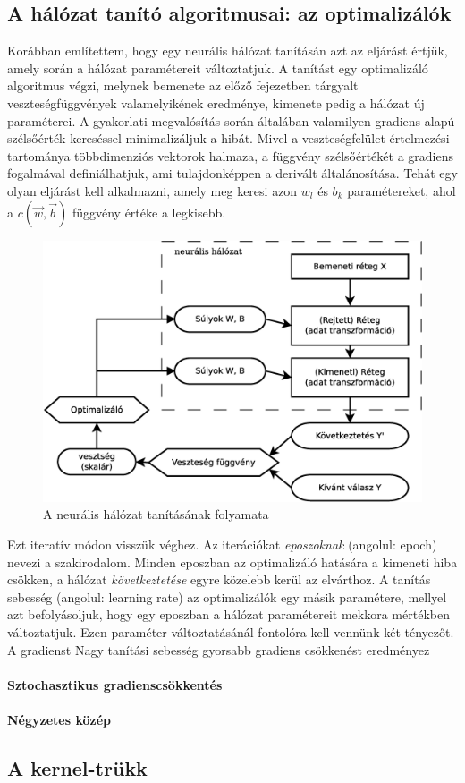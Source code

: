 \subsection{A hálózat tanító algoritmusai: az optimalizálók}
Korábban említettem, hogy egy neurális hálózat tanításán azt az eljárást értjük, amely során a hálózat paramétereit változtatjuk. A tanítást egy optimalizáló algoritmus végzi, melynek bemenete az előző fejezetben tárgyalt veszteségfüggvények valamelyikének eredménye, kimenete pedig a hálózat új paraméterei. A gyakorlati megvalósítás során általában valamilyen gradiens alapú szélsőérték kereséssel minimalizáljuk a hibát. Mivel a veszteségfelület értelmezési tartománya többdimenziós vektorok halmaza, a függvény szélsőértékét a gradiens fogalmával definiálhatjuk, ami tulajdonképpen a derivált általánosítása. Tehát egy olyan eljárást kell alkalmazni, amely meg keresi azon $w_l$ és $b_k$ paramétereket, ahol a $c(\vec{w},\vec{b})$ függvény értéke a legkisebb.
\begin{figure}[h]
	\centering
	\includegraphics[width=0.7\linewidth]{fig/DNN_dia}
	\caption{A neurális hálózat tanításának folyamata}
	\label{fig:dnn}
\end{figure}

Ezt iteratív módon visszük véghez. Az iterációkat \emph{eposzoknak} (angolul: epoch) nevezi a szakirodalom. Minden eposzban az optimalizáló hatására a kimeneti hiba csökken, a hálózat \emph{következtetése} egyre közelebb kerül az elvárthoz. A tanítás sebesség (angolul: learning rate) az optimalizálók egy másik paramétere, mellyel azt befolyásoljuk, hogy egy eposzban a hálózat paramétereit mekkora mértékben változtatjuk. Ezen paraméter változtatásánál fontolóra kell vennünk két tényezőt.
A gradienst
Nagy tanítási sebesség gyorsabb gradiens csökkenést eredményez

\paragraph[SGD]{Sztochasztikus gradienscsökkentés}

\paragraph[RMSprop]{Négyzetes közép}

\subsection{A kernel-trükk}

